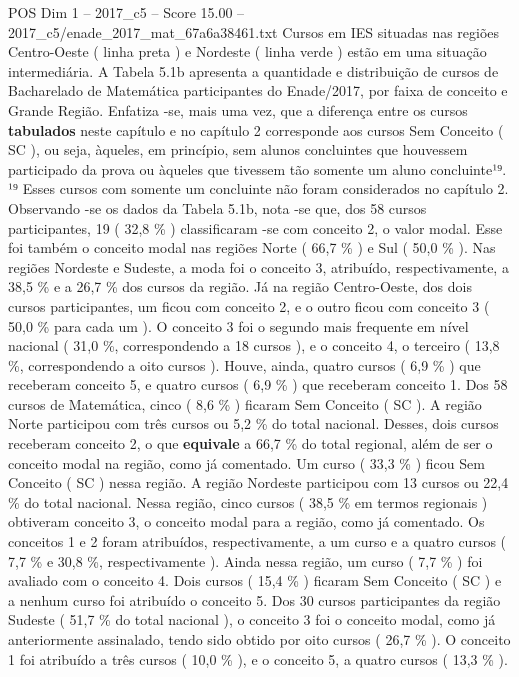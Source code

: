 \begin{textsample}{POS Dim 1 – 2017\_c5 – Score 15.00 – 2017\_c5/enade\_2017\_mat\_67a6a38461.txt}
Cursos em IES situadas nas regiões Centro-Oeste ( linha preta ) e Nordeste ( linha verde ) estão em uma situação intermediária.
A Tabela 5.1b apresenta a quantidade e distribuição de cursos de Bacharelado de Matemática participantes do Enade/2017, por faixa de conceito e Grande Região.
Enfatiza -se, mais uma vez, que a diferença entre os cursos \textbf{tabulados} neste capítulo e no capítulo 2 corresponde aos cursos Sem Conceito ( SC ), ou seja, àqueles, em princípio, sem alunos concluintes que houvessem participado da prova ou àqueles que tivessem tão somente um aluno concluinte¹⁹. ¹⁹ Esses cursos com somente um concluinte não foram considerados no capítulo 2.
Observando -se os dados da Tabela 5.1b, nota -se que, dos 58 cursos participantes, 19 ( 32,8 \% ) classificaram -se com conceito 2, o valor modal.
Esse foi também o conceito modal nas regiões Norte ( 66,7 \% ) e Sul ( 50,0 \% ).
Nas regiões Nordeste e Sudeste, a moda foi o conceito 3, atribuído, respectivamente, a 38,5 \% e a 26,7 \% dos cursos da região.
Já na região Centro-Oeste, dos dois cursos participantes, um ficou com conceito 2, e o outro ficou com conceito 3 ( 50,0 \% para cada um ).
O conceito 3 foi o segundo mais frequente em nível nacional ( 31,0 \%, correspondendo a 18 cursos ), e o conceito 4, o terceiro ( 13,8 \%, correspondendo a oito cursos ).
Houve, ainda, quatro cursos ( 6,9 \% ) que receberam conceito 5, e quatro cursos ( 6,9 \% ) que receberam conceito 1.
Dos 58 cursos de Matemática, cinco ( 8,6 \% ) ficaram Sem Conceito ( SC ).
A região Norte participou com três cursos ou 5,2 \% do total nacional.
Desses, dois cursos receberam conceito 2, o que \textbf{equivale} a 66,7 \% do total regional, além de ser o conceito modal na região, como já comentado.
Um curso ( 33,3 \% ) ficou Sem Conceito ( SC ) nessa região.
A região Nordeste participou com 13 cursos ou 22,4 \% do total nacional.
Nessa região, cinco cursos ( 38,5 \% em termos regionais ) obtiveram conceito 3, o conceito modal para a região, como já comentado.
Os conceitos 1 e 2 foram atribuídos, respectivamente, a um curso e a quatro cursos ( 7,7 \% e 30,8 \%, respectivamente ).
Ainda nessa região, um curso ( 7,7 \% ) foi avaliado com o conceito 4.
Dois cursos ( 15,4 \% ) ficaram Sem Conceito ( SC ) e a nenhum curso foi atribuído o conceito 5.
Dos 30 cursos participantes da região Sudeste ( 51,7 \% do total nacional ), o conceito 3 foi o conceito modal, como já anteriormente assinalado, tendo sido obtido por oito cursos ( 26,7 \% ).
O conceito 1 foi atribuído a três cursos ( 10,0 \% ), e o conceito 5, a quatro cursos ( 13,3 \% ).

\end{textsample}
